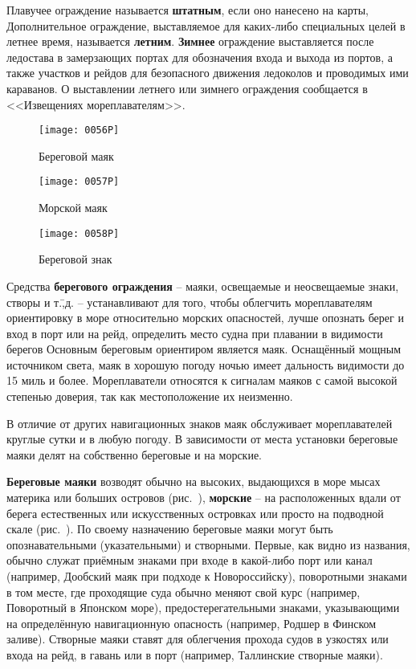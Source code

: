 Плавучее ограждение называется
\textbf{штатным}, если оно нанесено на
карты, Дополнительное ограждение, выставляемое для каких-либо
специальных целей в летнее время, называется
\textbf{летним}. \textbf{Зимнее}
ограждение выставляется после ледостава в замерзающих портах для
обозначения входа и выхода из портов, а также участков и рейдов для
безопасного движения ледоколов и проводимых ими караванов. О
выставлении летнего или зимнего ограждения сообщается в <<Извещениях
мореплавателям>>.

\begin{figure}[htb]
  \centering{}
  \texttt{[image: 0056P]}
  \caption{Береговой маяк}
  \label{fig:56}
\end{figure}

\begin{figure}[htb]
  \centering{}
  \texttt{[image: 0057P]}
  \caption{Морской маяк}
  \label{fig:57}
\end{figure}

\begin{figure}[htb]
  \centering{}
  \texttt{[image: 0058P]}
  \caption{Береговой знак}
  \label{fig:58}
\end{figure}


Средства \textbf{берегового ограждения}
\--- маяки, освещаемые и неосвещаемые знаки, створы и т.\=,д. \---
устанавливают для того, чтобы облегчить мореплавателям ориентировку в
море относительно морских опасностей, лучше опознать берег и вход в
порт или на рейд, определить место судна при плавании в видимости
берегов Основным береговым ориентиром является маяк. Оснащённый мощным
источником света, маяк в хорошую погоду ночью имеет дальность
видимости до 15 миль и более. Мореплаватели относятся к
сигналам маяков с самой высокой степенью доверия, так как
местоположение их неизменно.

В отличие от других навигационных знаков маяк обслуживает
мореплавателей круглые сутки и в любую погоду. В зависимости от места
установки береговые маяки делят на собственно береговые и на морские.

\textbf{Береговые маяки} возводят обычно на высоких, выдающихся в море
мысах материка или больших островов (рис.~), \textbf{морские}
\--- на расположенных вдали от берега естественных или искусственных
островках или просто на подводной скале (рис.~). По своему
назначению береговые маяки могут быть опознавательными (указательными)
и створными. Первые, как видно из названия, обычно служат приёмным
знаками при входе в какой-либо порт или канал (например, Дообский маяк
при подходе к Новороссийску), поворотными знаками в том месте, где
проходящие суда обычно меняют свой курс (например, Поворотный в
Японском море), предостерегательными знаками, указывающими на
определённую навигационную опасность (например, Родшер в Финском
заливе). Створные маяки ставят для облегчения прохода судов в узкостях
или входа на рейд, в гавань или в порт (например, Таллинские створные
маяки).

